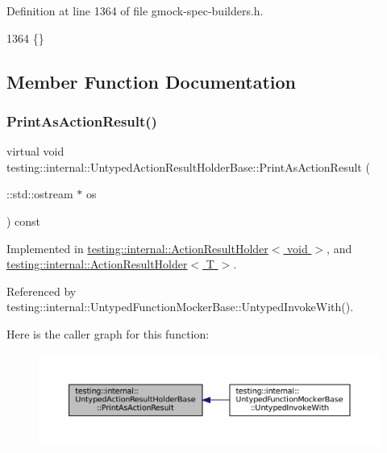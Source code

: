 Definition at line 1364 of file gmock-\/spec-\/builders.\+h.


\begin{DoxyCode}
1364 \{\}
\end{DoxyCode}


\subsection{Member Function Documentation}
\mbox{\label{classtesting_1_1internal_1_1UntypedActionResultHolderBase_a4b4a558fcb1d3b02c0fec34f186d3b90}} 
\subsubsection{\texorpdfstring{Print\+As\+Action\+Result()}{PrintAsActionResult()}}
{\footnotesize\ttfamily virtual void testing\+::internal\+::\+Untyped\+Action\+Result\+Holder\+Base\+::\+Print\+As\+Action\+Result (\begin{DoxyParamCaption}\item[{\+::std\+::ostream $\ast$}]{os }\end{DoxyParamCaption}) const\hspace{0.3cm}{\ttfamily [pure virtual]}}



Implemented in \hyperlink{classtesting_1_1internal_1_1ActionResultHolder_3_01void_01_4_ab829399d5a7d6fc9f0ecde0c0a6a3aeb}{testing\+::internal\+::\+Action\+Result\+Holder$<$ void $>$}, and \hyperlink{classtesting_1_1internal_1_1ActionResultHolder_a06d1fb40fc863328dbcc102bc46dece4}{testing\+::internal\+::\+Action\+Result\+Holder$<$ T $>$}.



Referenced by testing\+::internal\+::\+Untyped\+Function\+Mocker\+Base\+::\+Untyped\+Invoke\+With().

Here is the caller graph for this function\+:
\nopagebreak
\begin{figure}[H]
\begin{center}
\leavevmode
\includegraphics[width=350pt]{classtesting_1_1internal_1_1UntypedActionResultHolderBase_a4b4a558fcb1d3b02c0fec34f186d3b90_icgraph}
\end{center}
\end{figure}


